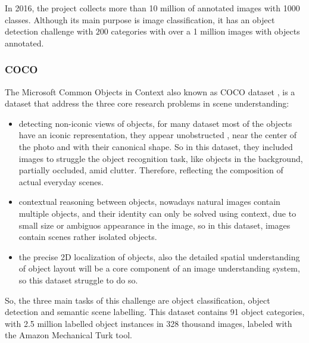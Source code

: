 \documentclass[12pt, a4paper, titlepage,twoside,openright]{article}
\begin{document}
In 2016, the project collects more than 10 million of annotated images with 1000 classes. Although its main purpose is image classification, it has an object detection challenge with $200$ categories with over a 1 million images with objects annotated.







\subsubsection{COCO}

The Microsoft Common Objects in Context also known as COCO dataset \cite{coco}, is a dataset that address the three core research problems in scene understanding:


\begin{itemize}

\item detecting non-iconic views of objects, for many dataset most of the objects have an iconic representation, they appear unobstructed , near the center of the photo and with their canonical shape. So in this dataset, they included images to struggle the object recognition task, like objects in the background, partially occluded, amid clutter. Therefore, reflecting the composition of actual everyday scenes.

\item contextual reasoning between objects, nowadays natural images contain multiple objects, and their identity can only be solved using context, due to small size or ambiguos appearance in the image, so in this dataset, images contain scenes rather isolated objects. 

\item the precise 2D localization of objects, also the detailed spatial understanding of object layout will be a core component of an image understanding system, so this dataset struggle to do so.



\end{itemize}


So, the three main tasks of this challenge are object classification, object detection and semantic scene labelling. This dataset contains 91 object categories, with 2.5 million labelled object instances in 328 thousand images, labeled with the Amazon Mechanical Turk tool.
\end{document}
